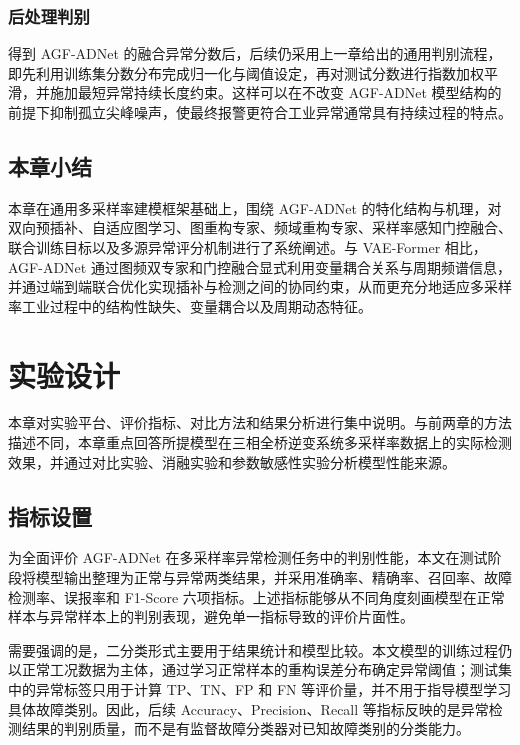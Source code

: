 \documentclass[bachelor, vlined]{DissertUESTC}
\begin{document}
    \subsection{后处理判别}

    得到 AGF-ADNet 的融合异常分数后，后续仍采用上一章给出的通用判别流程，即先利用训练集分数分布完成归一化与阈值设定，再对测试分数进行指数加权平滑，并施加最短异常持续长度约束。这样可以在不改变 AGF-ADNet 模型结构的前提下抑制孤立尖峰噪声，使最终报警更符合工业异常通常具有持续过程的特点。

    \section{本章小结}

    本章在通用多采样率建模框架基础上，围绕 AGF-ADNet 的特化结构与机理，对双向预插补、自适应图学习、图重构专家、频域重构专家、采样率感知门控融合、联合训练目标以及多源异常评分机制进行了系统阐述。与 VAE-Former 相比，AGF-ADNet 通过图频双专家和门控融合显式利用变量耦合关系与周期频谱信息，并通过端到端联合优化实现插补与检测之间的协同约束，从而更充分地适应多采样率工业过程中的结构性缺失、变量耦合以及周期动态特征。


	\chapter{实验设计}

    本章对实验平台、评价指标、对比方法和结果分析进行集中说明。与前两章的方法描述不同，本章重点回答所提模型在三相全桥逆变系统多采样率数据上的实际检测效果，并通过对比实验、消融实验和参数敏感性实验分析模型性能来源。

    \section{指标设置}

    为全面评价 AGF-ADNet 在多采样率异常检测任务中的判别性能，本文在测试阶段将模型输出整理为正常与异常两类结果，并采用准确率、精确率、召回率、故障检测率、误报率和 F1-Score 六项指标。上述指标能够从不同角度刻画模型在正常样本与异常样本上的判别表现，避免单一指标导致的评价片面性。

    需要强调的是，二分类形式主要用于结果统计和模型比较。本文模型的训练过程仍以正常工况数据为主体，通过学习正常样本的重构误差分布确定异常阈值；测试集中的异常标签只用于计算 TP、TN、FP 和 FN 等评价量，并不用于指导模型学习具体故障类别。因此，后续 Accuracy、Precision、Recall 等指标反映的是异常检测结果的判别质量，而不是有监督故障分类器对已知故障类别的分类能力。
\end{document}
